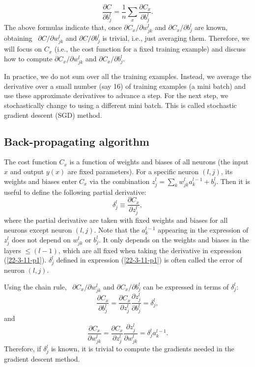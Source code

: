 \documentclass{article}
\begin{document}
\begin{equation}
  \label{22-3-11-a4} \frac{\partial C}{\partial b_j^l} = \frac{1}{n} \sum_x
  \frac{\partial C_x}{\partial b_j^l} .
\end{equation}
The above formulas indicate that, once $\partial C_x / \partial w^l_{j k}$ and
$\partial C_x / \partial b^l_j$ are known, obtaining \ $\partial C / \partial
w^l_{j k}$ and $\partial C / \partial b^l_j$ is trivial, i.e., just averaging
them. Therefore, we will focus on $C_x$ (i.e., the cost function for a fixed
training example) and discuss how to compute $\partial C_x / \partial w^l_{j
k}$ and $\partial C_x / \partial b^l_j$.

In practice, we do not sum over all the training examples. Instead, we
average the derivative over a small number (say 16) of training examples (a
mini batch) and use these approximate derivatives to advance a step. For the
next step, we stochastically change to using a different mini batch. This is
called stochastic gradient descent (SGD) method.

\subsection{Back-propagating algorithm}

The cost function $C_x$ is a function of weights and biases of all neurons
(the input $x$ and output $y (x)$ are fixed parameters). For a specific neuron
$(l, j)$, its weights and biases enter $C_x$ via the combination $z_j^l =
\sum_k w_{j k}^l a^{l - 1}_k + b^l_j$. Then it is useful to define the
following partial derivative:
\begin{equation}
  \label{22-3-11-p1} \delta^l_j \equiv \frac{\partial C_x}{\partial z_j^l},
\end{equation}
where the partial derivative are taken with fixed weights and biases for all
neurons except neuron $(l, j)$. Note that the $a_k^{l - 1}$ appearing in the
expression of $z_j^l$ does not depend on $w^l_{j k}$ or $b^l_j$. It only
depends on the weights and biases in the layers $\leqslant (l - 1)$, which are
all fixed when taking the derivative in expression (\ref{22-3-11-p1}).
$\delta^l_j$ defined in expression (\ref{22-3-11-p1}) is often called the
error of neuron $(l, j)$.

Using the chain rule, \ $\partial C_x / \partial w^l_{j k}$ and $\partial C_x
/ \partial b^l_j$ can be expressed in terms of $\delta^l_j$:
\begin{equation}
  \frac{\partial C_x}{\partial b_j^l} = \frac{\partial C_x}{\partial z_j^l} 
  \frac{\partial z^l_j}{\partial b_j^l} = \delta^l_j,
\end{equation}
and
\begin{equation}
  \frac{\partial C_x}{\partial w_{j k}^l} = \frac{\partial C_x}{\partial
  z_j^l}  \frac{\partial z^l_j}{\partial w_{j k}^l} = \delta^l_j a_k^{l - 1} .
\end{equation}
Therefore, if $\delta^l_j$ is known, it is trivial to compute the gradients
needed in the gradient descent method.
\end{document}
